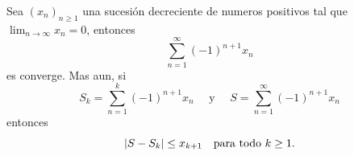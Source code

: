 \documentclass[12pt,a4paper]{article}
\begin{document}
    \begin{ejercicio}
        Sea $(x_{n})_{n\geq1}$ una sucesión decreciente de numeros positivos tal que
        $\lim_{n\to\infty}x_{n}=0$, entonces
        \begin{equation*}
            \sum_{n=1}^{\infty}(-1)^{n+1}x_{n}
        \end{equation*}
        es converge. Mas aun, si
        \begin{equation*}
            S_{k}=\sum_{n=1}^{k}(-1)^{n+1}x_{n}\quad\text{ y }\quad S=\sum_{n=1}^{\infty}(-1)^{n+1}x_{n}
        \end{equation*}
        entonces
        \begin{equation*}
            \abs{S-S_{k}}\leq x_{k+1}\quad\text{para todo }k\geq1.
        \end{equation*}
    \end{ejercicio}
\end{document}
